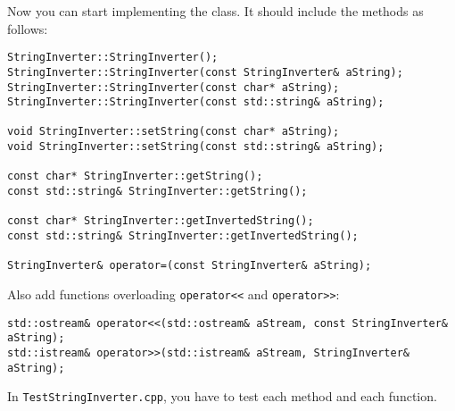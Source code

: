 Now you can start implementing the class. It should include the methods as follows:
\begin{lstlisting}
StringInverter::StringInverter();
StringInverter::StringInverter(const StringInverter& aString);
StringInverter::StringInverter(const char* aString);
StringInverter::StringInverter(const std::string& aString);

void StringInverter::setString(const char* aString);
void StringInverter::setString(const std::string& aString);

const char* StringInverter::getString();
const std::string& StringInverter::getString();

const char* StringInverter::getInvertedString();
const std::string& StringInverter::getInvertedString();

StringInverter& operator=(const StringInverter& aString);
\end{lstlisting}

Also add functions overloading \verb+operator<<+ and \verb+operator>>+:
\begin{lstlisting}
std::ostream& operator<<(std::ostream& aStream, const StringInverter& aString);
std::istream& operator>>(std::istream& aStream, StringInverter& aString);
\end{lstlisting}

In \verb+TestStringInverter.cpp+, you have to test each method and each function. 
